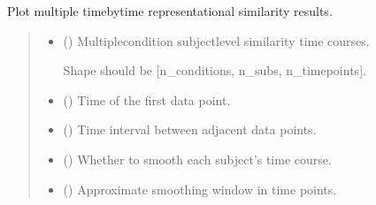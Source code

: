 \documentclass[letterpaper,10pt,english]{sphinxhowto}
\begin{document}
\begin{fulllineitems}
\pysigstopsignatures
\sphinxAtStartPar
Plot multiple time\sphinxhyphen{}by\sphinxhyphen{}time representational similarity results.
\begin{quote}\begin{description}
\begin{itemize}
\item {} 
\sphinxAtStartPar
{} (\sphinxstyleliteralemphasis{\sphinxupquote{, }}\sphinxstyleliteralemphasis{\sphinxupquote{ {[}}}\sphinxstyleliteralemphasis{\sphinxupquote{, }}\sphinxstyleliteralemphasis{\sphinxupquote{, }}\sphinxstyleliteralemphasis{\sphinxupquote{{]}}}) \textendash{} 
\sphinxAtStartPar
Multiple\sphinxhyphen{}condition subject\sphinxhyphen{}level similarity time courses.

\sphinxAtStartPar
Shape should be {[}n\_conditions, n\_subs, n\_timepoints{]}.


\item {} 
\sphinxAtStartPar
{} (\sphinxstyleliteralemphasis{\sphinxupquote{, }}) \textendash{} Time of the first data point.

\item {} 
\sphinxAtStartPar
{} (\sphinxstyleliteralemphasis{\sphinxupquote{, }}) \textendash{} Time interval between adjacent data points.

\item {} 
\sphinxAtStartPar
{} (\sphinxstyleliteralemphasis{\sphinxupquote{, }}) \textendash{} Whether to smooth each subject’s time course.

\item {} 
\sphinxAtStartPar
{} (\sphinxstyleliteralemphasis{\sphinxupquote{, }}) \textendash{} Approximate smoothing window in time points.


\end{itemize}
\end{description}
\end{quote}
\end{fulllineitems}
\end{document}
